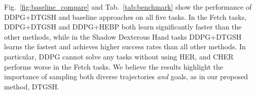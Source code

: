 Fig.~\ref{fig:baseline_compare} and Tab.~\ref{tab:benchmark} show the performance of DDPG+DTGSH and baseline approaches on all five tasks. In the Fetch tasks, DDPG+DTGSH and DDPG+HEBP both learn significantly faster than the other methods, while in the Shadow Dexterous Hand tasks DDPG+DTGSH learns the fastest and achieves higher success rates than all other methods. In particular, DDPG cannot solve any tasks without using HER, and CHER performs worse in the Fetch tasks. We believe the results highlight the importance of sampling both diverse trajectories \textit{and} goals, as in our proposed method, DTGSH.
\begin{table}[h]
    \centering
    \vspace{0.2em}
    \caption{Final mean success rate $\pm$ standard deviation, with best results in \textbf{bold}.}
    \label{tab:benchmark}
\end{table}
